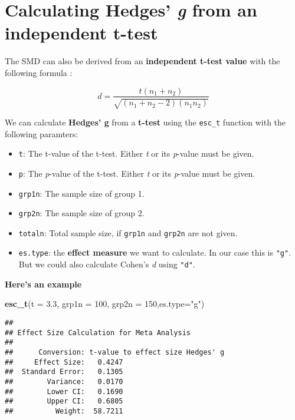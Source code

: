 \documentclass[]{book}
\newenvironment{Shaded}{\begin{snugshade}}{\end{snugshade}}
\newcommand{\KeywordTok}[1]{\textcolor[rgb]{0.13,0.29,0.53}{\textbf{#1}}}
\newcommand{\DataTypeTok}[1]{\textcolor[rgb]{0.13,0.29,0.53}{#1}}
\newcommand{\DecValTok}[1]{\textcolor[rgb]{0.00,0.00,0.81}{#1}}
\newcommand{\FloatTok}[1]{\textcolor[rgb]{0.00,0.00,0.81}{#1}}
\newcommand{\StringTok}[1]{\textcolor[rgb]{0.31,0.60,0.02}{#1}}
\newcommand{\NormalTok}[1]{#1}
\providecommand{\tightlist}{%
  \setlength{\itemsep}{0pt}\setlength{\parskip}{0pt}}
\theoremstyle{definition}
\theoremstyle{definition}
\theoremstyle{definition}
\theoremstyle{remark}
\begin{document}
\hypertarget{g}{\section{\texorpdfstring{Calculating Hedges' \emph{g}
from an independent
t-test}{Calculating Hedges' g from an independent t-test}}\label{g}}

The SMD can also be derived from an \textbf{independent t-test value}
with the following formula \citep{thalheimer2002calculate}:

\[d = \frac {t(n_1+n_2)}{\sqrt{(n_1+n_2-2)(n_1n_2)}}\]

We can calculate \textbf{Hedges' g} from a \textbf{t-test} using the
\texttt{esc\_t} function with the following paramters:

\begin{itemize}
\tightlist
\item
  \texttt{t}: The t-value of the t-test. Either \emph{t} or its
  \emph{p}-value must be given.
\item
  \texttt{p}: The \emph{p}-value of the t-test. Either \emph{t} or its
  \emph{p}-value must be given.
\item
  \texttt{grp1n}: The sample size of group 1.
\item
  \texttt{grp2n}: The sample size of group 2.
\item
  \texttt{totaln}: Total sample size, if \texttt{grp1n} and
  \texttt{grp2n} are not given.
\item
  \texttt{es.type}: the \textbf{effect measure} we want to calculate. In
  our case this is \texttt{"g"}. But we could also calculate Cohen's
  \emph{d} using \texttt{"d"}.
\end{itemize}

\textbf{Here's an example}

\begin{Shaded}
\begin{Highlighting}[]
\KeywordTok{esc_t}\NormalTok{(}\DataTypeTok{t =} \FloatTok{3.3}\NormalTok{, }\DataTypeTok{grp1n =} \DecValTok{100}\NormalTok{, }\DataTypeTok{grp2n =} \DecValTok{150}\NormalTok{,}\DataTypeTok{es.type=}\StringTok{"g"}\NormalTok{)}
\end{Highlighting}
\end{Shaded}

\begin{verbatim}
## 
## Effect Size Calculation for Meta Analysis
## 
##      Conversion: t-value to effect size Hedges' g
##     Effect Size:   0.4247
##  Standard Error:   0.1305
##        Variance:   0.0170
##        Lower CI:   0.1690
##        Upper CI:   0.6805
##          Weight:  58.7211
\end{verbatim}
\end{document}
